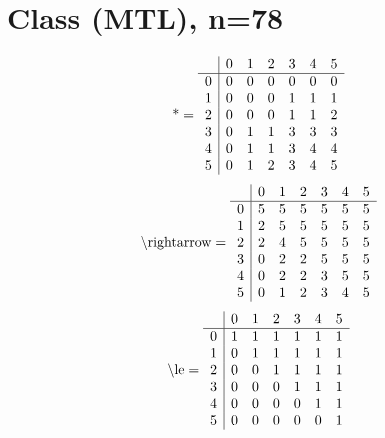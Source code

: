 \documentclass[11pt]{article}
\begin{document}
\section{Class (MTL), n=78}
\[\text{*} = 
\begin{array}{r | r r r r r r}
 & 0 & 1 & 2 & 3 & 4 & 5 \\ \hline
0 & 0 & 0 & 0 & 0 & 0 & 0 \\
1 & 0 & 0 & 0 & 1 & 1 & 1 \\
2 & 0 & 0 & 0 & 1 & 1 & 2 \\
3 & 0 & 1 & 1 & 3 & 3 & 3 \\
4 & 0 & 1 & 1 & 3 & 4 & 4 \\
5 & 0 & 1 & 2 & 3 & 4 & 5 \\
\end{array}
\]
\[\text{\textbackslash rightarrow} = 
\begin{array}{r | r r r r r r}
 & 0 & 1 & 2 & 3 & 4 & 5 \\ \hline
0 & 5 & 5 & 5 & 5 & 5 & 5 \\
1 & 2 & 5 & 5 & 5 & 5 & 5 \\
2 & 2 & 4 & 5 & 5 & 5 & 5 \\
3 & 0 & 2 & 2 & 5 & 5 & 5 \\
4 & 0 & 2 & 2 & 3 & 5 & 5 \\
5 & 0 & 1 & 2 & 3 & 4 & 5 \\
\end{array}
\]
\[\text{\textbackslash le} = 
\begin{array}{r | r r r r r r}
 & 0 & 1 & 2 & 3 & 4 & 5 \\ \hline
0 & 1 & 1 & 1 & 1 & 1 & 1 \\
1 & 0 & 1 & 1 & 1 & 1 & 1 \\
2 & 0 & 0 & 1 & 1 & 1 & 1 \\
3 & 0 & 0 & 0 & 1 & 1 & 1 \\
4 & 0 & 0 & 0 & 0 & 1 & 1 \\
5 & 0 & 0 & 0 & 0 & 0 & 1 \\
\end{array}
\]
\end{document}
